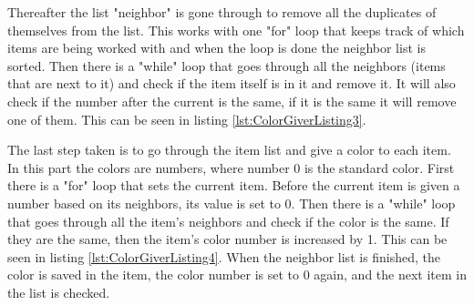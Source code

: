 Thereafter the list "neighbor" is gone through to remove all the duplicates of themselves from the list. This works with one "for" loop that keeps track of which items are being worked with and when the loop is done the neighbor list is sorted. Then there is a "while" loop that goes through all the neighbors (items that are next to it) and check if the item itself is in it and remove it. It will also check if the number after the current is the same, if it is the same it will remove one of them. This can be seen in listing \ref{lst:ColorGiverListing3}.

The last step taken is to go through the item list and give a color to each item. In this part the colors are numbers, where number 0 is the standard color. First there is a "for" loop that sets the current item. Before the current item is given a number based on its neighbors, its value is set to 0. Then there is a "while" loop that goes through all the item's neighbors and check if the color is the same. If they are the same, then the item's color number is increased by 1. This can be seen in listing \ref{lst:ColorGiverListing4}. When the neighbor list is finished, the color is saved in the item, the color number is set to 0 again, and the next item in the list is checked.
